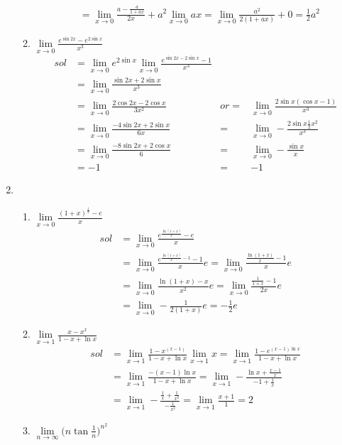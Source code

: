 \begin{enumerate}[{例}1.]
\begin{enumerate}[(1)]
\begin{align*}
                       &=\lim_{x\to0}\frac{a-\frac{a}{1+ax}}{2x}+a^2\lim_{x\to0}ax
                        =\lim_{x\to0}\frac{a^2}{2(1+ax)}+0
                        =\frac{1}{2}a^2
                \end{align*}
            \item $\lim\limits_{x\to0}\frac{e^{\sin 2x}-e^{2\sin x}}{x^3}$
                \begin{align*}
                    sol&=\lim_{x\to0}e^{2\sin x}\lim_{x\to0}\frac{e^{\sin 2x-2\sin x}-1}{x^3}\\
                       &=\lim_{x\to0}\frac{\sin 2x+2\sin x}{x^3}\\
                       &=\lim_{x\to0}\frac{2\cos 2x-2\cos x}{3x^2} &or=&\lim_{x\to0}\frac{2\sin x(\cos x-1)}{x^3}\\
                       &=\lim_{x\to0}\frac{-4\sin 2x+2\sin x}{6x}    &=&\lim_{x\to0}-\frac{2\sin x \frac{1}{2}x^2}{x^3}\\
                       &=\lim_{x\to0}\frac{-8\sin 2x+2\cos x}{6}     &=&\lim_{x\to0}-\frac{\sin x}{x}\\
                       &=-1                                          &=&-1
                \end{align*}
        \end{enumerate}
    \item  
        \begin{enumerate}[(1)]
            \item $\lim\limits_{x\to0}\frac{(1+x)^{\frac{1}{x}}-e}{x}$
                \begin{align*}
                    sol&=\lim_{x\to0}\frac{e^{\frac{\ln{(1+x)}}{x}}-e}{x}\\
                       &=\lim_{x\to0}\frac{e^{\frac{\ln{(1+x)}}{x}-1}-1}{x}e
                        =\lim_{x\to0}\frac{\frac{\ln{(1+x)}}{x}-1}{x}e\\
                       &=\lim_{x\to0}\frac{\ln{(1+x)}-x}{x^2}e
                        =\lim_{x\to0}\frac{\frac{1}{1+x}-1}{2x}e\\
                       &=\lim_{x\to0}-\frac{1}{2(1+x)}e
                        =-\frac{1}{2}e
                \end{align*}
            \item $\lim\limits_{x\to1}\frac{x-x^x}{1-x+\ln x}$
                \begin{align*}
                    sol&=\lim_{x\to1}\frac{1-x^{(x-1)}}{1-x+\ln x}\lim_{x\to1}x
                        =\lim_{x\to1}\frac{1-e^{(x-1)\ln x}}{1-x+\ln x}\\
                       &=\lim_{x\to1}\frac{-(x-1)\ln x}{1-x+\ln x}
                        =\lim_{x\to1}-\frac{\ln x +\frac{x-1}{x}}{-1+\frac{1}{x}}\\
                       &=\lim_{x\to1}-\frac{\frac{1}{x}+\frac{1}{x^2}}{-\frac{1}{x^2}}
                        =\lim_{x\to1}\frac{x+1}{1}
                        =2
                \end{align*}
            \item $\lim\limits_{n\to\infty}\Big(n\tan\frac{1}{n}\Big)^{n^2}$


\end{enumerate}
\end{enumerate}
